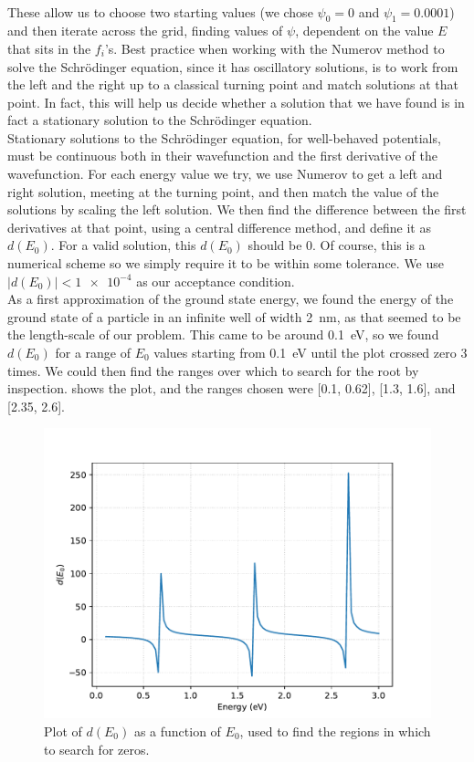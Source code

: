 \documentclass[11pt]{article}
\begin{document}
\begin{enumerate}
\begin{enumerate}
\begin{align}
        \end{align}
        These allow us to choose two starting values (we chose $\psi_0=0$ and $\psi_1=0.0001$) and then iterate across the grid, finding values of $\psi$, dependent on the value $E$ that sits in the $f_i$'s. Best practice when working with the Numerov method to solve the Schr\"odinger equation, since it has oscillatory solutions, is to work from the left and the right up to a classical turning point and match solutions at that point. In fact, this will help us decide whether a solution that we have found is in fact a stationary solution to the Schr\"odinger equation. \\
        Stationary solutions to the Schr\"odinger equation, for well-behaved potentials, must be continuous both in their wavefunction and the first derivative of the wavefunction. For each energy value we try, we use Numerov to get a left and right solution, meeting at the turning point, and then match the value of the solutions by scaling the left solution. We then find the difference between the first derivatives at that point, using a central difference method, and define it as $d(E_0)$. For a valid solution, this $d(E_0)$ should be 0. Of course, this is a numerical scheme so we simply require it to be within some tolerance. We use $|d(E_0)|<\num{1e-4}$ as our acceptance condition. \\
        As a first approximation of the ground state energy, we found the energy of the ground state of a particle in an infinite well of width \SI{2}{\nano\metre}, as that seemed to be the length-scale of our problem. This came to be around \SI{0.1}{\electronvolt}, so we found $d(E_0)$ for a range of $E_0$ values starting from \SI{0.1}{\electronvolt} until the plot crossed zero 3 times. We could then find the ranges over which to search for the root by inspection.  shows the plot, and the ranges chosen were [0.1, 0.62], [1.3, 1.6], and [2.35, 2.6].

        \begin{figure}[h]
            \begin{center}
                \includegraphics[width=.6\textwidth]{Plots/q2extra.pdf}
                \caption{Plot of $d(E_0)$ as a function of $E_0$, used to find the regions in which to search for zeros.}
                \label{fig:q2extra}
            \end{center}
        \end{figure}


\end{enumerate}
\end{enumerate}
\end{document}
